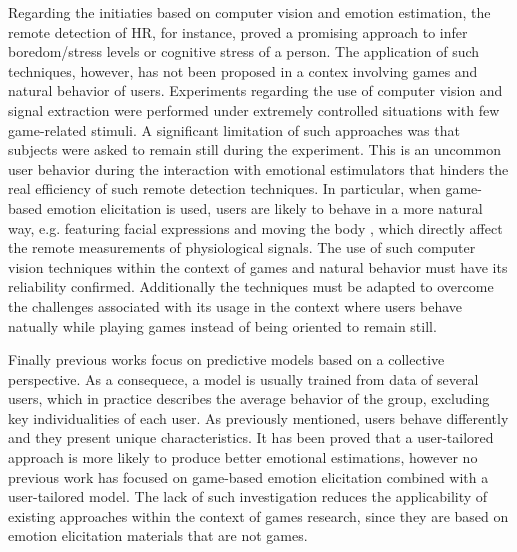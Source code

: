 Regarding the initiaties based on computer vision and emotion estimation, the remote detection of HR, for instance, proved a promising approach to infer boredom/stress levels \parencite{kukolja2014comparative} or cognitive stress \parencite{mcduff2014remote} of a person. The application of such techniques, however, has not been proposed in a contex involving games and natural behavior of users. Experiments regarding the use of computer vision and signal extraction were performed under extremely controlled situations with few game-related stimuli. A significant limitation of such approaches was that subjects were asked to remain still during the experiment. This is an uncommon user behavior during the interaction with emotional estimulators that hinders the real efficiency of such remote detection techniques. In particular, when game-based emotion elicitation is used, users are likely to behave in a more natural way, e.g. featuring facial expressions and moving the body \parencite{bevilacqua2016variations}, which directly affect the remote measurements of physiological signals. The use of such computer vision techniques within the context of games and natural behavior must have its reliability confirmed. Additionally the techniques must be adapted to overcome the challenges associated with its usage in the context where users behave natually while playing games instead of being oriented to remain still.

Finally previous works focus on predictive models based on a collective perspective. As a consequece, a model is usually trained from data of several users, which in practice describes the average behavior of the group, excluding key individualities of each user. As previously mentioned, users behave differently and they present unique characteristics. It has been proved that a user-tailored approach is more likely to produce better emotional estimations, however no previous work has focused on game-based emotion elicitation combined with a user-tailored model. The lack of such investigation reduces the applicability of existing approaches within the context of games research, since they are based on emotion elicitation materials that are not games.

